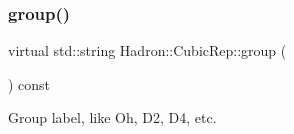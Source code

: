 \mbox{\label{structHadron_1_1CubicRep_a0748f11ec87f387062c8e8981339a29c}} 
\subsubsection{\texorpdfstring{group()}{group()}\hspace{0.1cm}{\footnotesize\ttfamily [2/3]}}
{\footnotesize\ttfamily virtual std\+::string Hadron\+::\+Cubic\+Rep\+::group (\begin{DoxyParamCaption}{ }\end{DoxyParamCaption}) const\hspace{0.3cm}{\ttfamily [pure virtual]}}

Group label, like Oh, D2, D4, etc. 

